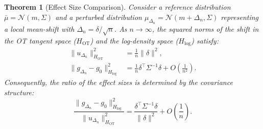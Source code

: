 \documentclass{article}
\theoremstyle{plain}
\newtheorem{theorem}{Theorem}[section]
\theoremstyle{definition}
\theoremstyle{remark}
\begin{document}
\begin{theorem}[Effect Size Comparison]\label{thm:OT-vs-log}
Consider a reference distribution $\bar\mu = \mathcal N(m,\Sigma)$ and a perturbed distribution $\mu_{\Delta_n} = \mathcal N(m+\Delta_n,\Sigma)$ representing a local mean-shift with $\Delta_n = \delta/\sqrt{n}$.
As $n\to\infty$, the squared norms of the shift in the OT tangent space ($H_{\mathrm{OT}}$) and the log-density space ($H_{\log}$) satisfy:
\begin{align}
\|u_{\Delta_n}\|_{H_{\mathrm{OT}}}^2 &= \frac{1}{n}\|\delta\|^2, \label{eq:OT-norm} \\
\|g_{\Delta_n}-g_0\|_{H_{\log}}^2 &= \frac{1}{n}\delta^\top\Sigma^{-1}\delta + O\left(\frac{1}{n^2}\right). \label{eq:log-norm}
\end{align}
Consequently, the ratio of the effect sizes is determined by the covariance structure:
\begin{equation}
\frac{\|g_{\Delta_n}-g_0\|_{H_{\log}}^2} {\|u_{\Delta_n}\|_{H_{\mathrm{OT}}}^2} = \frac{\delta^\top\Sigma^{-1}\delta}{\|\delta\|^2} + O\left(\frac{1}{n}\right).
\end{equation}
\end{theorem}
\end{document}
